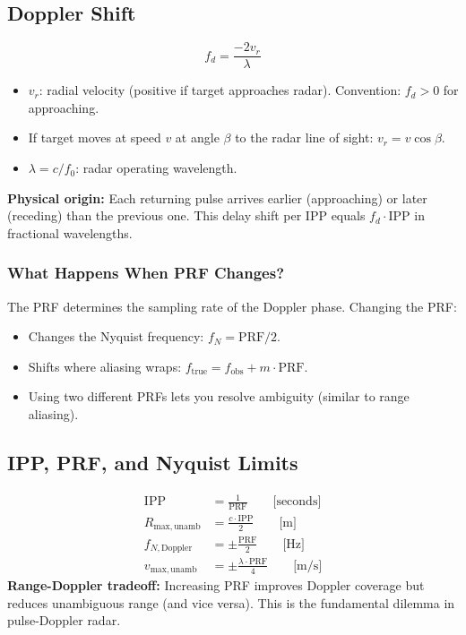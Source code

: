 \documentclass[10pt,letterpaper]{article}
\begin{document}
\subsection{Doppler Shift}

\begin{tcolorbox}[formulabox, title={Doppler Shift Formula}]
\begin{equation}
  f_d = \frac{-2v_r}{\lambda}
\end{equation}
\begin{itemize}[noitemsep]
  \item $v_r$: radial velocity (positive if target approaches radar). Convention: $f_d > 0$ for approaching.
  \item If target moves at speed $v$ at angle $\beta$ to the radar line of sight: $v_r = v\cos\beta$.
  \item $\lambda = c/f_0$: radar operating wavelength.
\end{itemize}
\textbf{Physical origin:} Each returning pulse arrives earlier (approaching) or later (receding) than the previous one. This delay shift per IPP equals $f_d\cdot\mathrm{IPP}$ in fractional wavelengths.
\end{tcolorbox}

\subsubsection{What Happens When PRF Changes?}
The PRF determines the sampling rate of the Doppler phase. Changing the PRF:
\begin{itemize}[noitemsep]
  \item Changes the Nyquist frequency: $f_{N} = \mathrm{PRF}/2$.
  \item Shifts where aliasing wraps: $f_\mathrm{true} = f_\mathrm{obs} + m\cdot\mathrm{PRF}$.
  \item Using two different PRFs lets you resolve ambiguity (similar to range aliasing).
\end{itemize}

\subsection{IPP, PRF, and Nyquist Limits}

\begin{tcolorbox}[formulabox, title={IPP, PRF, Nyquist, and Aliasing Limits}]
\begin{align}
  \mathrm{IPP} &= \frac{1}{\mathrm{PRF}} \qquad \text{[seconds]} \\[4pt]
  R_\mathrm{max,unamb} &= \frac{c\cdot\mathrm{IPP}}{2} \qquad \text{[m]} \\[4pt]
  f_{N,\mathrm{Doppler}} &= \pm\frac{\mathrm{PRF}}{2} \qquad \text{[Hz]}\\[4pt]
  v_\mathrm{max,unamb} &= \pm\frac{\lambda\cdot\mathrm{PRF}}{4} \qquad \text{[m/s]}
\end{align}
\textbf{Range-Doppler tradeoff:} Increasing PRF improves Doppler coverage but reduces unambiguous range (and vice versa). This is the fundamental dilemma in pulse-Doppler radar.
\end{tcolorbox}
\end{document}
